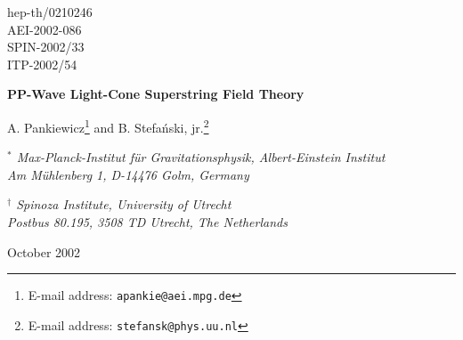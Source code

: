 \documentclass[12pt]{article}
\numberwithin{equation}{section} \setlength{\textwidth}{17cm}
\begin{document}
\thispagestyle{empty}
\addtocounter{page}{-1}
\def\thefootnote{\fnsymbol{footnote}}
\begin{flushright}
  hep-th/0210246 \\
  AEI-2002-086 \\
  SPIN-2002/33 \\
  ITP-2002/54
\end{flushright}

\vskip 0.5cm

\begin{center}\LARGE
{\bf PP-Wave Light-Cone Superstring Field Theory}
\end{center}

\vskip 1.0cm

\begin{center}
{\large A. Pankiewicz\footnote{E-mail address: {\tt apankie@aei.mpg.de}} and
B. Stefa\'nski, jr.\footnote{E-mail address: {\tt stefansk@phys.uu.nl}}}

\vskip 0.5cm

{\it $^*$ Max-Planck-Institut f\"ur Gravitationsphysik, Albert-Einstein
Institut \\ Am M\"uhlenberg 1, D-14476 Golm, Germany}

\vskip 0.5cm

{\it $^\dagger$ Spinoza Institute, University of Utrecht \\
Postbus 80.195, 3508 TD Utrecht, The Netherlands}
\end{center}

\vskip 1.0cm

\begin{center}
October 2002
\end{center}

\vskip 1.0cm

\begin{abstract}
\noindent 
We construct the cubic interaction vertex and dynamically
generated supercharges in light-cone superstring field theory in the pp-wave background. We show that these satisfy
the pp-wave superalgebra at first order in string coupling. 
The cubic interaction vertex and dynamical supercharges presented here differ from the expressions previously given 
in the literature.
Using this vertex we compute various string theory
three-point functions and comment on their relation to gauge theory in the BMN limit.
\end{abstract}

\vfill

\setcounter{footnote}{0}
\def\thefootnote{\arabic{footnote}}
\newpage
\end{document}
